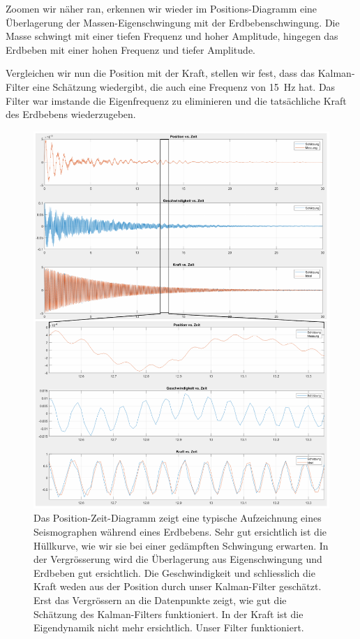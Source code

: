 Zoomen wir näher ran, erkennen wir wieder im Positions-Diagramm eine Überlagerung der Massen-Eigenschwingung mit der Erdbebenschwingung.
Die Masse schwingt mit einer tiefen Frequenz und hoher Amplitude, hingegen das Erdbeben mit einer hohen Frequenz und tiefer Amplitude.

Vergleichen wir nun die Position mit der Kraft, stellen wir fest, dass das Kalman-Filter eine Schätzung wiedergibt, die auch eine Frequenz von \SI{15}{\hertz} hat.
Das Filter war imstande die Eigenfrequenz zu eliminieren und die tatsächliche Kraft des Erdbebens wiederzugeben.

\begin{figure}
  \begin{center}
    \includegraphics[width=.95\linewidth,keepaspectratio]{papers/erdbeben/images/standard.PDF}
    \caption{
      Das Position-Zeit-Diagramm zeigt eine typische Aufzeichnung eines Seismographen während eines Erdbebens.
      Sehr gut ersichtlich ist die Hüllkurve, wie wir sie bei einer gedämpften Schwingung erwarten.
      In der Vergrösserung wird die Überlagerung aus Eigenschwingung und Erdbeben gut ersichtlich.
      Die Geschwindigkeit und schliesslich die Kraft weden aus der Position durch unser Kalman-Filter geschätzt.
      Erst das Vergrössern an die Datenpunkte zeigt, wie gut die Schätzung des Kalman-Filters funktioniert.
      In der Kraft ist die Eigendynamik nicht mehr ersichtlich. Unser Filter funktioniert.
      }
    \label{erdbeben:fig:standard-alles}
  \end{center}
\end{figure}

